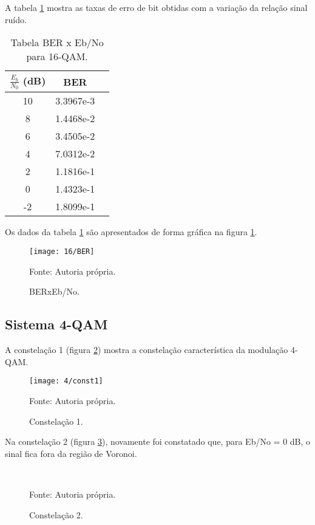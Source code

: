A tabela \ref{tab:rber16} mostra as taxas de erro de bit obtidas com a variação da relação sinal ruído.

\begin{table}[H]
  \begin{center}
    \caption{Tabela BER x Eb/No para 16-QAM.}
    \begin{tabular}{ccc}
      \toprule
      $\frac{E_b}{N_0}$ (dB) & BER \\
      \midrule
      10 & 3.3967e-3 \\
      8 & 1.4468e-2 \\
      6 & 3.4505e-2 \\
      4 & 7.0312e-2 \\
      2 & 1.1816e-1 \\
      0 & 1.4323e-1 \\
      -2 & 1.8099e-1 \\
      \bottomrule
    \end{tabular}
    \label{tab:rber16}
  \end{center}
\end{table}

Os dados da tabela \ref{tab:rber16} são apresentados de forma gráfica na figura \ref{fig:16BER}.

\begin{figure}[H]
  \centering
  \caption{BERxEb/No.}
  \texttt{[image: 16/BER]}
  \label{fig:16BER}
  
  \small Fonte: Autoria própria.
\end{figure}

\subsection{Sistema 4-QAM}

A constelação 1 (figura \ref{fig:4const1}) mostra a constelação característica da modulação 4-QAM.

\begin{figure}[H]
  \centering
  \caption{Constelação 1.}
  \texttt{[image: 4/const1]}
  \label{fig:4const1}
  
  \small Fonte: Autoria própria.
\end{figure}

Na constelação 2 (figura \ref{fig:4const2}), novamente foi constatado que, para Eb/No = 0 dB, o sinal fica fora da região de Voronoi.

\begin{figure}[H]
  \centering
  \caption{Constelação 2.}
  
  \\
  
  \label{fig:4const2}
  
  \small Fonte: Autoria própria.
\end{figure}

